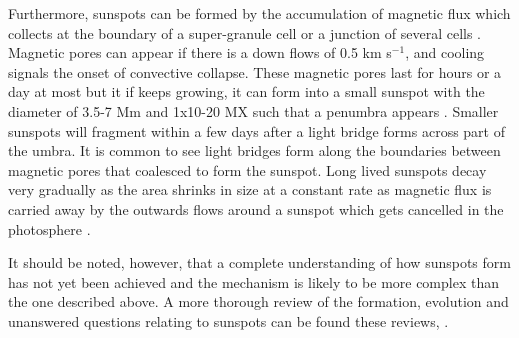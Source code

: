     Furthermore, sunspots can be formed by the accumulation of magnetic flux which collects at the boundary of a super-granule cell or a junction of several cells \cite{1974MNRAS.169...35M}.
    Magnetic pores can appear if there is a down flows of 0.5 km s$^{-1}$, and cooling signals the onset of convective collapse.
    These magnetic pores last for hours or a day at most but it if keeps growing, it can form into a small sunspot with the diameter of 3.5-7 Mm and 1x10-20 MX such that a penumbra appears \citep{2010A&A...512L...1S}.
    Smaller sunspots will fragment within a few days after a light bridge forms across part of the umbra.
    It is common to see light bridges form along the boundaries between magnetic pores that coalesced to form the sunspot.
    Long lived sunspots decay very gradually as the area shrinks in size at a constant rate as magnetic flux is carried away by the outwards flows around a sunspot which gets cancelled in the photosphere \citep{2002AN....323..342M,2008ApJ...686.1447K}.
                          
    It should be noted, however, that a complete understanding of how sunspots form has not yet been achieved and the mechanism is likely to be more complex than the one described above.
    A more thorough review of the formation, evolution and unanswered questions relating to sunspots can be found these reviews, \cite{SAO,2008sust.book.....T,lrsp-2011-3}.

